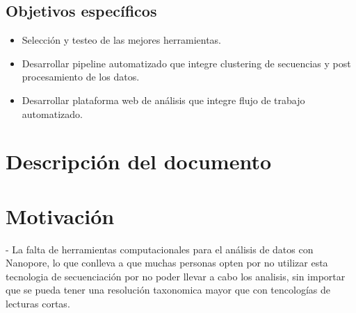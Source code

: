 \subsection{Objetivos específicos}
\begin{itemize}
    \item Selección y testeo de las mejores herramientas.
    \item Desarrollar pipeline automatizado que integre clustering de secuencias y post procesamiento de los datos.
    \item Desarrollar plataforma web de análisis que integre flujo de trabajo automatizado.
\end{itemize}
\section{Descripción del documento}
\section{Motivación}
 
- La falta de herramientas computacionales para el análisis de datos con Nanopore, lo que conlleva a que muchas personas opten por no utilizar esta tecnologia de secuenciación por no poder llevar a cabo los analisis, sin importar que se pueda tener una resolución taxonomica mayor que con tencologías de lecturas cortas.
